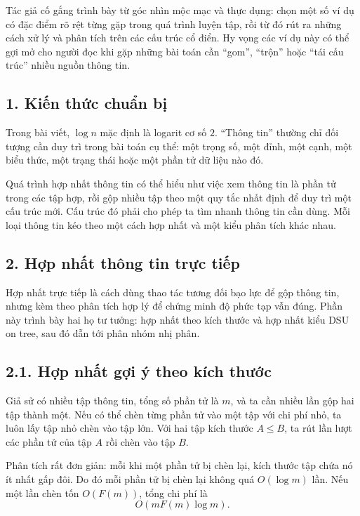 \documentclass[11pt]{article}
\begin{document}
Tác giả cố gắng trình bày từ góc nhìn mộc mạc và thực dụng: chọn một số ví dụ
có đặc điểm rõ rệt từng gặp trong quá trình luyện tập, rồi từ đó rút ra những
cách xử lý và phân tích trên các cấu trúc cổ điển. Hy vọng các ví dụ này có thể
gợi mở cho người đọc khi gặp những bài toán cần ``gom'', ``trộn'' hoặc ``tái
cấu trúc'' nhiều nguồn thông tin.

\subsection*{1. Kiến thức chuẩn bị}

Trong bài viết, \(\log n\) mặc định là logarit cơ số \(2\). ``Thông tin''
thường chỉ đối tượng cần duy trì trong bài toán cụ thể: một trọng số, một đỉnh,
một cạnh, một biểu thức, một trạng thái hoặc một phần tử dữ liệu nào đó.

Quá trình hợp nhất thông tin có thể hiểu như việc xem thông tin là phần tử
trong các tập hợp, rồi gộp nhiều tập theo một quy tắc nhất định để duy trì một
cấu trúc mới. Cấu trúc đó phải cho phép ta tìm nhanh thông tin cần dùng. Mỗi
loại thông tin kéo theo một cách hợp nhất và một kiểu phân tích khác nhau.

\subsection*{2. Hợp nhất thông tin trực tiếp}

Hợp nhất trực tiếp là cách dùng thao tác tương đối bạo lực để gộp thông tin,
nhưng kèm theo phân tích hợp lý để chứng minh độ phức tạp vẫn đúng. Phần này
trình bày hai họ tư tưởng: hợp nhất theo kích thước và hợp nhất kiểu DSU on
tree, sau đó dẫn tới phân nhóm nhị phân.

\subsection*{2.1. Hợp nhất gợi ý theo kích thước}

Giả sử có nhiều tập thông tin, tổng số phần tử là \(m\), và ta cần nhiều lần
gộp hai tập thành một. Nếu có thể chèn từng phần tử vào một tập với chi phí
nhỏ, ta luôn lấy tập nhỏ chèn vào tập lớn. Với hai tập kích thước \(A\le B\),
ta rút lần lượt các phần tử của tập \(A\) rồi chèn vào tập \(B\).

Phân tích rất đơn giản: mỗi khi một phần tử bị chèn lại, kích thước tập chứa nó
ít nhất gấp đôi. Do đó mỗi phần tử bị chèn lại không quá \(O(\log m)\) lần. Nếu
một lần chèn tốn \(O(F(m))\), tổng chi phí là
\[
  O(mF(m)\log m).
\]
\end{document}
